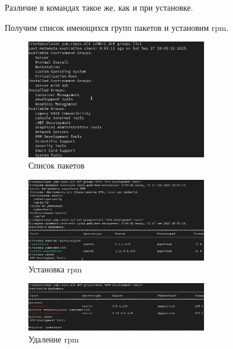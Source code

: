 \documentclass[
  12pt,
  a4paper,
  DIV=11,
  numbers=noendperiod]{scrreprt}
\begin{document}
Различие в командах такое же, как и при установке.

Получим список имеющихся групп пакетов и установим rpm.

\begin{figure}

{\centering \includegraphics[width=0.7\textwidth,height=\textheight]{image/9.png}

}

\caption{Список пакетов}

\end{figure}%
\begin{figure}

{\centering \includegraphics[width=0.7\textwidth,height=\textheight]{image/10.png}

}

\caption{Установка rpm}

\end{figure}%
\begin{figure}

{\centering \includegraphics[width=0.7\textwidth,height=\textheight]{image/11.png}

}

\caption{Удаление rpm}

\end{figure}%
\end{document}
